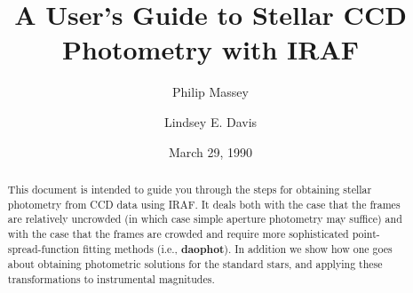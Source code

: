 
\title{A User's Guide to Stellar CCD Photometry with IRAF}
\author{Philip Massey \and Lindsey E. Davis}
\date{March 29, 1990}
\maketitle
\begin{abstract}
This document is intended to guide you through the steps for obtaining
stellar photometry from CCD data using IRAF.  It deals both with the
case that the frames are relatively uncrowded (in which case simple
aperture photometry may suffice) and with the case that the frames
are crowded and require more sophisticated point-spread-function
fitting methods (i.e., {\bf daophot}).  In addition we show how one
goes about obtaining photometric solutions for the standard stars, and
applying these transformations to instrumental magnitudes.
\end{abstract}
\tableofcontents
\eject
